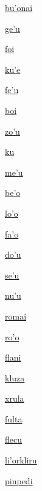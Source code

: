 {\hyperlink{val:buhonai}{bu'onai}}{}{}{}

{\hyperlink{val:gehu}{ge'u}}{}{}{}

{\hyperlink{val:foi}{foi}}{}{}{}

{\hyperlink{val:kuhe}{ku'e}}{}{}{}

{\hyperlink{val:fehu}{fe'u}}{}{}{}

{\hyperlink{val:boi}{boi}}{}{}{}

{\hyperlink{val:zohu}{zo'u}}{}{}{}

{\hyperlink{val:ku}{ku}}{}{}{}

{\hyperlink{val:mehu}{me'u}}{}{}{}

{\hyperlink{val:beho}{be'o}}{}{}{}

{\hyperlink{val:loho}{lo'o}}{}{}{}

{\hyperlink{val:faho}{fa'o}}{}{}{}

{\hyperlink{val:dohu}{do'u}}{}{}{}

{\hyperlink{val:sehu}{se'u}}{}{}{}

{\hyperlink{val:nuhu}{nu'u}}{}{}{}

{\hyperlink{val:romai}{romai}}{}{}{}

{\hyperlink{val:roho}{ro'o}}{}{}{}

{\hyperlink{val:flani}{flani}}{}{}{}

{\hyperlink{val:kluza}{kluza}}{}{}{}

{\hyperlink{val:xrula}{xrula}}{}{}{}

{\hyperlink{val:fulta}{fulta}}{}{}{}

{\hyperlink{val:flecu}{flecu}}{}{}{}

{\hyperlink{val:lihorkliru}{li'orkliru}}{}{}{}

{\hyperlink{val:pinpedi}{pinpedi}}{}{}{}

